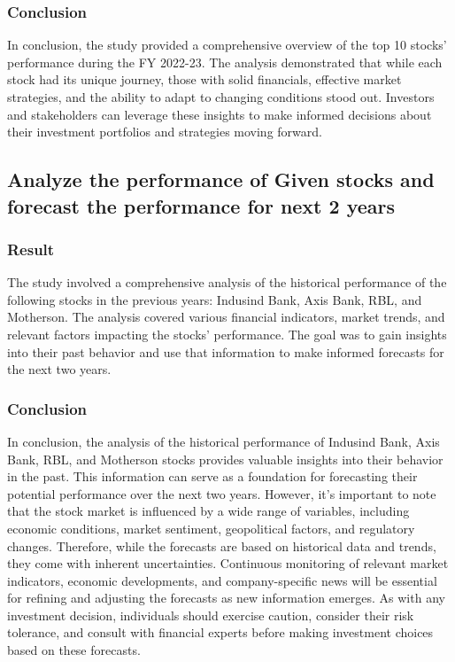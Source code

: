\subsubsection{Conclusion}
In conclusion, the study provided a comprehensive overview of the top 10 stocks' performance during the FY 2022-23. The analysis demonstrated that while each stock had its unique journey, those with solid financials, effective market strategies, and the ability to adapt to changing conditions stood out. Investors and stakeholders can leverage these insights to make informed decisions about their investment portfolios and strategies moving forward.

\subsection{Analyze the performance of Given stocks and forecast the performance for next 2 years}
\subsubsection{Result}

The study involved a comprehensive analysis of the historical performance of the following stocks in the previous years: Indusind Bank, Axis Bank, RBL, and Motherson. The analysis covered various financial indicators, market trends, and relevant factors impacting the stocks' performance. The goal was to gain insights into their past behavior and use that information to make informed forecasts for the next two years.

\subsubsection{Conclusion}

In conclusion, the analysis of the historical performance of Indusind Bank, Axis Bank, RBL, and Motherson stocks provides valuable insights into their behavior in the past. This information can serve as a foundation for forecasting their potential performance over the next two years. However, it's important to note that the stock market is influenced by a wide range of variables, including economic conditions, market sentiment, geopolitical factors, and regulatory changes. Therefore, while the forecasts are based on historical data and trends, they come with inherent uncertainties. Continuous monitoring of relevant market indicators, economic developments, and company-specific news will be essential for refining and adjusting the forecasts as new information emerges. As with any investment decision, individuals should exercise caution, consider their risk tolerance, and consult with financial experts before making investment choices based on these forecasts.

